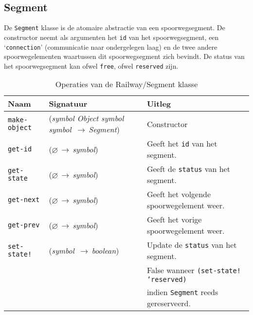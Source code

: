 \documentclass[a4paper, 11pt]{article}
\newcommand{\naar}{\,$\rightarrow$\,}
\renewcommand{\empty}{$\varnothing$}
\newcommand{\<}{\scriptsize\textless\normalsize}
\renewcommand{\>}{\scriptsize\textgreater\normalsize}
\begin{document}
\subsection{Segment} %
De \texttt{Segment} klasse is de atomaire abstractie van een spoorwegsegment. De constructor neemt als argumenten het \texttt{id} van het spoorwegsegment, een \lq\texttt{connection}' (communicatie naar ondergelegen laag) en de twee andere spoorwegelementen waartussen dit spoorwegsegment zich bevindt. De status van het spoorwegsegment kan ofwel \texttt{free}, ofwel \texttt{reserved} zijn.
\begin{table}[H]
	\begin{center}
		{
		\begin{tabular}{|l l l|}
			\hline
			\textbf{Naam} & \textbf{Signatuur} & \textbf{Uitleg}\\
			\hline
			\texttt{make-object} & (\textit{symbol Object symbol symbol} \naar \textit{Segment}) & Constructor\\
			\hline
			\texttt{get-id} & (\empty \naar \textit{symbol}) & Geeft het \texttt{id} van het segment.\\
			\texttt{get-state} & (\empty \naar \textit{symbol}) & Geeft de \texttt{status} van het segment.\\
			\texttt{get-next} & (\empty \naar \textit{symbol}) & Geeft het volgende spoorwegelement weer.\\
			\texttt{get-prev} & (\empty \naar \textit{symbol}) & Geeft het vorige spoorwegelement weer.\\
			\texttt{set-state!} & (\textit{symbol} \naar \textit{boolean}) & Update de \texttt{status} van het segment.\\
			&& False wanneer \texttt{(set-state! 'reserved)}\\
			&& indien \texttt{Segment} reeds gereserveerd.\\
			\hline
		\end{tabular}}
		\caption{Operaties van de Railway/Segment klasse}
	\end{center}
\end{table}

\end{document}
